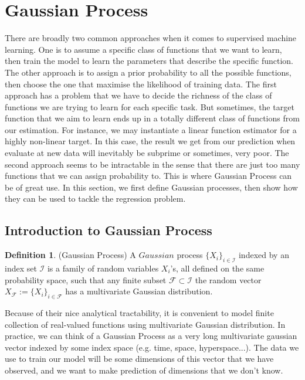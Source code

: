 \documentclass[[11pt,twoside,a4paper]{article}
\theoremstyle{definition}
\newtheorem{definition}[theorem]{Definition}
\numberwithin{equation}{section}
\begin{document}
\section{Gaussian Process}

There are broadly two common approaches when it comes to supervised machine learning. One is to assume a specific class of functions that we want to learn, then train the model to learn the parameters that describe the specific function. The other approach is to assign a prior probability to all the possible functions, then choose the one that maximise the likelihood of training data. The first approach has a problem that we have to decide the richness of the class of functions we are trying to learn for each specific task. But sometimes, the target function that we aim to learn ends up in a totally different class of functions from our estimation. For instance, we may instantiate a linear function estimator for a highly non-linear target. In this case, the result we get from our prediction when evaluate at new data will inevitably be subprime or sometimes, very poor. The second approach seems to be intractable in the sense that there are just too many functions that we can assign probability to. This is where Gaussian Process can be of great use. In this section, we first define Gaussian processes, then show how they can be used to tackle the regression problem. 

\subsection{Introduction to Gaussian Process}

\begin{definition}(Gaussian Process)
	A $Gaussian$ process $\{X_i\}_{i\in \mathcal{I}}$ indexed by an index set $\mathcal{I}$ is a family of random variables $X_i$'s, all defined on the same probability space, such that any finite subset $\mathcal{F}\subset\mathcal{I}$ the random vector $X_{\mathcal{F}} := \{X_i\}_{i\in \mathcal{F}}$ has a multivariate Gaussian distribution.\cite[Lalley]{Lalley}
\end{definition}

Because of their nice analytical tractability, it is convenient to model finite collection of real-valued functions using  multivariate Gaussian distribution. In practice, we can think of a Gaussian Process as a very long multivariate gaussian vector indexed by some index space (e.g. time, space, hyperspace...). The data we use to train our model will be some dimensions of this vector that we have observed, and we want to make prediction of dimensions that we don't know. 
\end{document}
